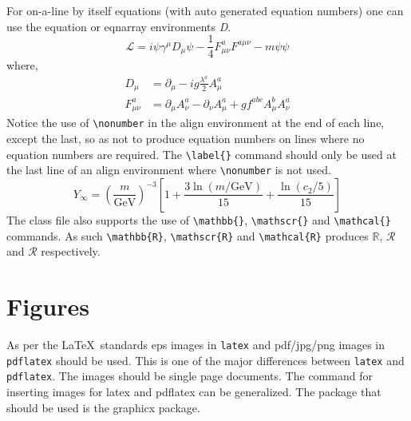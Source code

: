 \documentclass{CUP-JNL-DTM}%
\theoremstyle{definition}
\numberwithin{equation}{section}
\begin{document}
For on-a-line by itself equations (with auto generated equation numbers)
one can use the equation or eqnarray environments \textit{D}.
\begin{equation}
\mathcal{L} = i {\psi} \gamma^\mu D_\mu \psi
    - \frac{1}{4} F_{\mu\nu}^a F^{a\mu\nu} - m {\psi} \psi
\label{eq1}
\end{equation}
where,
\begin{align}
D_\mu &=  \partial_\mu - ig \frac{\lambda^a}{2} A^a_\mu
\nonumber \\
F^a_{\mu\nu} &= \partial_\mu A^a_\nu - \partial_\nu A^a_\mu
    + g f^{abc} A^b_\mu A^a_\nu
\label{eq2}
\end{align}
Notice the use of \verb+\nonumber+ in the align environment at the end
of each line, except the last, so as not to produce equation numbers on
lines where no equation numbers are required. The \verb+\label{}+ command
should only be used at the last line of an align environment where
\verb+\nonumber+ is not used.
\begin{equation}
Y_\infty = \left( \frac{m}{\textrm{GeV}} \right)^{-3}
    \left[ 1 + \frac{3 \ln(m/\textrm{GeV})}{15}
    + \frac{\ln(c_2/5)}{15} \right]
\end{equation}
The class file also supports the use of \verb+\mathbb{}+, \verb+\mathscr{}+ and
\verb+\mathcal{}+ commands. As such \verb+\mathbb{R}+, \verb+\mathscr{R}+
and \verb+\mathcal{R}+ produces $\mathbb{R}$, $\mathscr{R}$ and $\mathcal{R}$
respectively.

\section{Figures}

As per the \LaTeX\ standards eps images in \verb!latex! and pdf/jpg/png images in
\verb!pdflatex! should be used. This is one of the major differences between \verb!latex!
and \verb!pdflatex!. The images should be single page documents. The command for inserting images
for latex and pdflatex can be generalized. The package that should be used
is the graphicx package.
\end{document}
